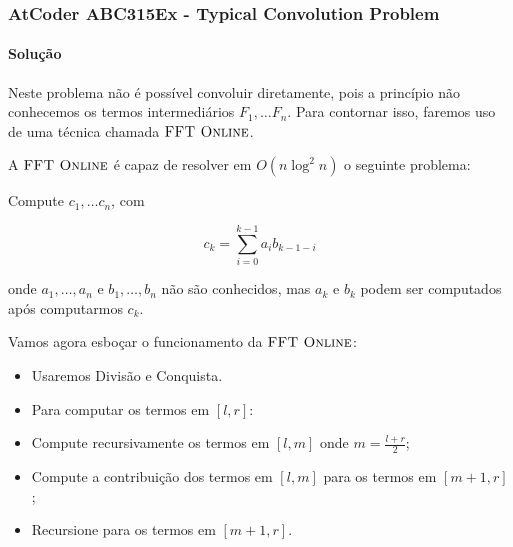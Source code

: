 \begin{frame}[t]
     \frametitle{AtCoder ABC315Ex - Typical Convolution Problem} %
     \framesubtitle{Solução}
             {
                  Neste problema não é possível convoluir diretamente, pois a princípio não conhecemos os termos intermediários $F_1, \dots F_{n}$. Para contornar isso, faremos uso de uma técnica chamada $\textsc{FFT Online}$.
                  
            }

             {
                  A $\textsc{FFT Online}$ é capaz de resolver em $O(n \log^2 n)$ o seguinte problema:

                  Compute $c_1, \dots c_n$, com

                  $$
                        c_k = \sum_{i=0}^{k-1} a_i b_{k-1-i}
                  $$

                  onde $a_1, \dots, a_n$ e $b_1, \dots, b_n$ não são conhecidos, mas $a_k$ e $b_k$ podem ser computados após computarmos $c_k$.
                  
            }

             {
                  Vamos agora esboçar o funcionamento da $\textsc{FFT Online}$:
                  \begin{itemize}
                        \item Usaremos Divisão e Conquista.
                        \item Para computar os termos em $[l, r]$:
                        \item Compute recursivamente os termos em $[l, m]$ onde $m = \frac{l+r}{2}$;
                        \item Compute a contribuição dos termos em $[l, m]$ para os termos em $[m+1, r]$;
                        \item Recursione para os termos em $[m+1, r]$.
                  \end{itemize}
            }

\end{frame}


